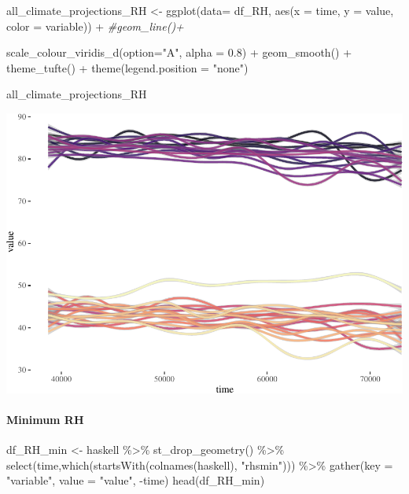 \documentclass[
  paper=a4,
  ,captions=tableheading
]{scrartcl}
\newenvironment{Shaded}{\begin{snugshade}}{\end{snugshade}}
\newcommand{\AttributeTok}[1]{\textcolor[rgb]{0.77,0.63,0.00}{#1}}
\newcommand{\CommentTok}[1]{\textcolor[rgb]{0.56,0.35,0.01}{\textit{#1}}}
\newcommand{\FloatTok}[1]{\textcolor[rgb]{0.00,0.00,0.81}{#1}}
\newcommand{\FunctionTok}[1]{\textcolor[rgb]{0.00,0.00,0.00}{#1}}
\newcommand{\NormalTok}[1]{#1}
\newcommand{\OtherTok}[1]{\textcolor[rgb]{0.56,0.35,0.01}{#1}}
\newcommand{\SpecialCharTok}[1]{\textcolor[rgb]{0.00,0.00,0.00}{#1}}
\newcommand{\StringTok}[1]{\textcolor[rgb]{0.31,0.60,0.02}{#1}}
\begin{document}
\begin{Shaded}
\begin{Highlighting}[]
\NormalTok{all\_climate\_projections\_RH }\OtherTok{\textless{}{-}} \FunctionTok{ggplot}\NormalTok{(}\AttributeTok{data=}\NormalTok{ df\_RH, }\FunctionTok{aes}\NormalTok{(}\AttributeTok{x =}\NormalTok{ time, }\AttributeTok{y =}\NormalTok{ value, }\AttributeTok{color =}\NormalTok{ variable)) }\SpecialCharTok{+} 
  \CommentTok{\#geom\_line()+}
  
  \FunctionTok{scale\_colour\_viridis\_d}\NormalTok{(}\AttributeTok{option=}\StringTok{"A"}\NormalTok{, }\AttributeTok{alpha =} \FloatTok{0.8}\NormalTok{) }\SpecialCharTok{+}
  \FunctionTok{geom\_smooth}\NormalTok{() }\SpecialCharTok{+}
  \FunctionTok{theme\_tufte}\NormalTok{() }\SpecialCharTok{+}
  \FunctionTok{theme}\NormalTok{(}\AttributeTok{legend.position =} \StringTok{"none"}\NormalTok{) }
  

\NormalTok{all\_climate\_projections\_RH}
\end{Highlighting}
\end{Shaded}

\includegraphics{Haskell_files/figure-latex/unnamed-chunk-74-1.pdf}

\hypertarget{minimum-rh}{%
\paragraph{Minimum RH}\label{minimum-rh}}

\begin{Shaded}
\begin{Highlighting}[]
\NormalTok{df\_RH\_min }\OtherTok{\textless{}{-}}\NormalTok{ haskell }\SpecialCharTok{\%\textgreater{}\%}
  \FunctionTok{st\_drop\_geometry}\NormalTok{() }\SpecialCharTok{\%\textgreater{}\%}
  \FunctionTok{select}\NormalTok{(time,}\FunctionTok{which}\NormalTok{(}\FunctionTok{startsWith}\NormalTok{(}\FunctionTok{colnames}\NormalTok{(haskell), }\StringTok{"rhsmin"}\NormalTok{))) }\SpecialCharTok{\%\textgreater{}\%}
  \FunctionTok{gather}\NormalTok{(}\AttributeTok{key =} \StringTok{"variable"}\NormalTok{, }\AttributeTok{value =} \StringTok{"value"}\NormalTok{, }\SpecialCharTok{{-}}\NormalTok{time)}
\FunctionTok{head}\NormalTok{(df\_RH\_min)}
\end{Highlighting}
\end{Shaded}
\end{document}
